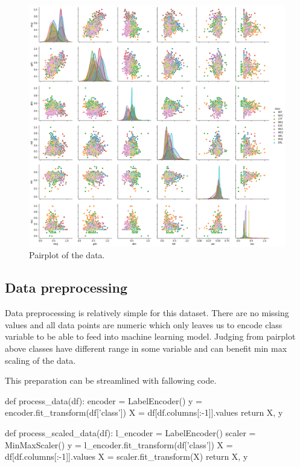 \documentclass[12pt]{article}
\begin{document}
\begin{figure}[H] \label{fig:pairplot}
    \centering
    \includegraphics[width=\textwidth]{img/pairplot.png}
    \caption{Pairplot of the data.}
\end{figure}

\subsection{Data preprocessing} \label{subsec:preprocess}
Data preprocessing is relatively simple for this dataset. There are no missing values and all data points are numeric which only leaves us to encode class variable to be able to feed into machine learning model. Judging from pairplot above classes have different range in some variable and can benefit min max scaling of the data. 

This preparation can be streamlined with fallowing code.

\begin{python}
    def process_data(df):
        encoder = LabelEncoder()
        y = encoder.fit_transform(df['class'])
        X = df[df.columns[:-1]].values
        return X, y

    def process_scaled_data(df):
        l_encoder = LabelEncoder()
        scaler = MinMaxScaler()
        y = l_encoder.fit_transform(df['class'])
        X = df[df.columns[:-1]].values
        X = scaler.fit_transform(X)
        return X, y
\end{python}
\end{document}
